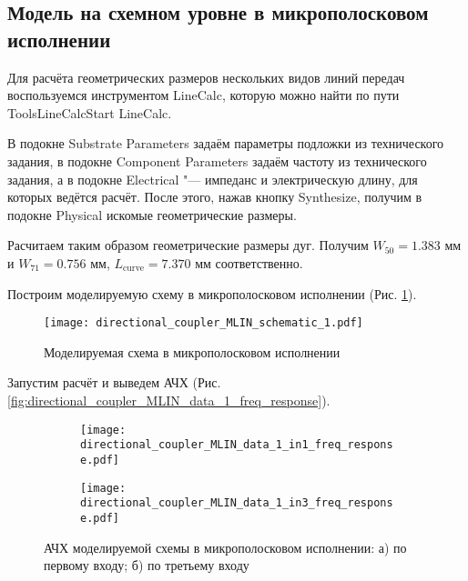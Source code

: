 \subsection{Модель на схемном уровне в микрополосковом исполнении}

Для расчёта геометрических размеров нескольких видов линий передач воспользуемся инструментом LineCalc, которую можно найти по пути Tools\textrightarrow LineCalc\textrightarrow Start LineCalc.

В подокне Substrate Parameters задаём параметры подложки из технического задания, в подокне Component Parameters задаём частоту из технического задания, а в подокне Electrical "--- импеданс и электрическую длину, для которых ведётся расчёт.
После этого, нажав кнопку Synthesize, получим в подокне Physical искомые геометрические размеры.

Расчитаем таким образом геометрические размеры дуг.
Получим $W_{50} = 1.383 \text{~мм}$ и $W_{71} = 0.756 \text{~мм}$, $L_\text{curve} = 7.370 \text{~мм}$ соответственно.

Построим моделируемую схему в микрополосковом исполнении (Рис. \ref{fig:directional_coupler_MLIN_schematic_1}).

\begin{figure}[!ht]
    \centering
    \texttt{[image: directional\_coupler\_MLIN\_schematic\_1.pdf]}
    \caption{Моделируемая схема в микрополосковом исполнении}
    \label{fig:directional_coupler_MLIN_schematic_1}
\end{figure}

Запустим расчёт и выведем АЧХ (Рис. \ref{fig:directional_coupler_MLIN_data_1_freq_response}).

\begin{figure}[!ht]
    \begin{subfigure}[b]{0.45\textwidth}
        \centering
        \texttt{[image: directional\_coupler\_MLIN\_data\_1\_in1\_freq\_response.pdf]}
        \caption{}
        \label{fig:directional_coupler_MLIN_data_1_in1_freq_response}
    \end{subfigure}
    \hfill
    \begin{subfigure}[b]{0.45\textwidth}
        \centering
        \texttt{[image: directional\_coupler\_MLIN\_data\_1\_in3\_freq\_response.pdf]}
        \caption{}
        \label{fig:directional_coupler_MLIN_data_1_in3_freq_response}
    \end{subfigure}
    \caption{АЧХ моделируемой схемы в микрополосковом исполнении:
        а) по первому входу;
        б) по третьему входу
    }
    \label{fig:directional_coupler_data_1_freq_response}
\end{figure}

